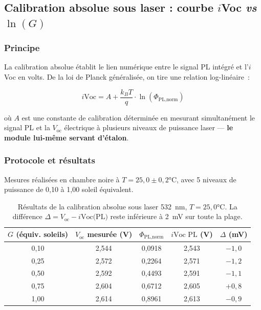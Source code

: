 \documentclass[12pt,a4paper]{report}
\begin{document}
\subsection{Calibration absolue sous laser : courbe $i$Voc \textit{vs} $\ln(G)$}

\subsubsection{Principe}

La calibration absolue établit le lien numérique entre le signal PL intégré et l'$i$Voc en volts. De la loi de Planck généralisée, on tire une relation log-linéaire~:

\begin{equation}
\boxed{i\text{Voc} = A + \frac{k_BT}{q} \cdot \ln(\Phi_\text{PL,norm})}
\label{eq:iVoc_calibration}
\end{equation}

où $A$ est une constante de calibration déterminée en mesurant simultanément le signal PL et la $V_\text{oc}$ électrique à plusieurs niveaux de puissance laser --- \textbf{le module lui-même servant d'étalon}.

\subsubsection{Protocole et résultats}

Mesures réalisées en chambre noire à $T = 25{,}0 \pm 0{,}2$°C, avec 5 niveaux de puissance de 0,10 à 1,00 soleil équivalent.

\begin{table}[H]
\centering
\caption{Résultats de la calibration absolue sous laser 532~nm, $T = 25{,}0$°C. La différence $\Delta = V_\text{oc} - i\text{Voc(PL)}$ reste inférieure à 2~mV sur toute la plage.}
\label{tab:calibration}
\begin{tabular}{ccccc}
\toprule
$G$ (équiv. soleils) & $V_\text{oc}$ mesurée (V) & $\Phi_\text{PL,norm}$ & $i\text{Voc PL}$ (V) & $\Delta$ (mV) \\
\midrule
0,10 & 2,544 & 0,0918 & 2,543 & $-1{,}0$ \\
0,25 & 2,572 & 0,2264 & 2,571 & $-1{,}2$ \\
0,50 & 2,592 & 0,4493 & 2,591 & $-1{,}1$ \\
0,75 & 2,604 & 0,6712 & 2,605 & $+0{,}8$ \\
1,00 & 2,614 & 0,8961 & 2,613 & $-0{,}9$ \\
\bottomrule
\end{tabular}
\end{table}
\end{document}
